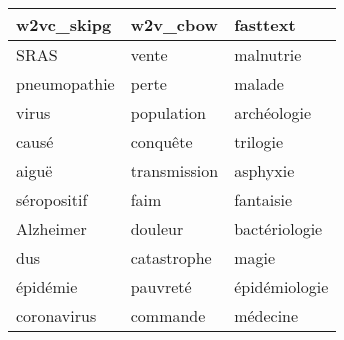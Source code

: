 \begin{tabular}{lll}
\toprule
   w2vc\_skipg &      w2v\_cbow &       fasttext \\
\midrule
         SRAS &         vente &      malnutrie \\
 pneumopathie &         perte &         malade \\
        virus &    population &    archéologie \\
        causé &      conquête &       trilogie \\
        aiguë &  transmission &       asphyxie \\
  séropositif &          faim &      fantaisie \\
    Alzheimer &       douleur &  bactériologie \\
          dus &   catastrophe &          magie \\
     épidémie &      pauvreté &  épidémiologie \\
  coronavirus &      commande &       médecine \\
\bottomrule
\end{tabular}
